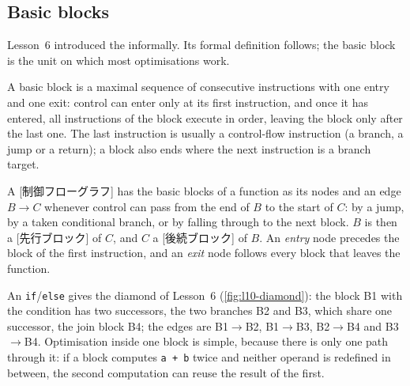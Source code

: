 \documentclass[../main.tex]{subfiles}
\begin{document}
\subsection{Basic blocks}

Lesson~6 introduced the  informally.  Its formal
definition follows; the basic block is the unit on which most optimisations work.

\begin{definition}
  \label{def:l10-basic-block}
  A basic block is a maximal sequence of consecutive
  instructions with one entry and one exit: control can enter only at
  its first instruction, and once it has entered, all instructions of
  the block execute in order, leaving the block only after the last
  one.  The last instruction is usually a control-flow instruction (a
  branch, a jump or a return); a block also ends where the next
  instruction is a branch target.
\end{definition}

\begin{definition}
  A [制御フローグラフ] has the basic
  blocks of a function as its nodes and an edge $B\to C$ whenever
  control can pass from the end of $B$ to the start of $C$: by a jump,
  by a taken conditional branch, or by falling through to the next
  block.  $B$ is then a
  [先行ブロック] of $C$, and $C$ a
  [後続ブロック] of $B$.  An \emph{entry} node
  precedes the block of the first instruction, and an \emph{exit}
  node follows every block that leaves the function.
\end{definition}

\begin{marginfigure}
  \centering
  
  \caption{The diamond CFG of an \texttt{if}/\texttt{else}.}
  \label{fig:l10-diamond}
\end{marginfigure}
An \texttt{if}/\texttt{else} gives the diamond of Lesson~6
(\cref{fig:l10-diamond}): the block B1 with the condition has two
successors, the two branches B2 and B3, which share one successor, the
join block B4; the edges are B1$\to$B2, B1$\to$B3, B2$\to$B4 and
B3$\to$B4.  Optimisation inside one block is simple, because there is
only one path through it: if a block computes \texttt{a + b} twice and
neither operand is redefined in between, the second computation can
reuse the result of the first.
\end{document}
